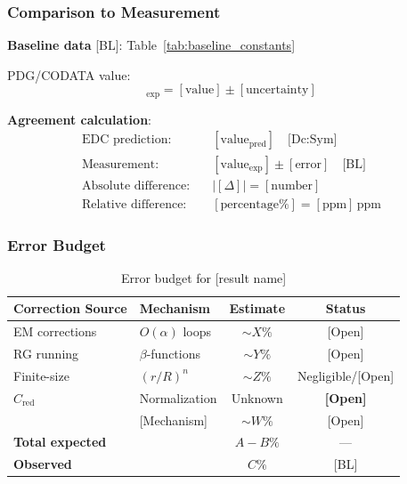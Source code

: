 
\subsubsection{Comparison to Measurement}

\textbf{Baseline data} [BL]: Table~\ref{tab:baseline_constants}

PDG/CODATA value:
\begin{equation}
  [\text{quantity}]_{\text{exp}} = [\text{value}] \pm [\text{uncertainty}]
\end{equation}

\textbf{Agreement calculation}:
\begin{align}
\text{EDC prediction:} \quad &[\text{value}_{\text{pred}}] \quad \text{[Dc:Sym]} \\
\text{Measurement:} \quad &[\text{value}_{\text{exp}}] \pm [\text{error}] \quad \text{[BL]} \\
\text{Absolute difference:} \quad &|[\Delta]| = [\text{number}] \\
\text{Relative difference:} \quad &[\text{percentage}\%] = [\text{ppm}]\,\text{ppm}
\end{align}


\subsubsection{Error Budget}

\begin{table}[h]
\centering
\begin{tabular}{llcc}
\hline
\textbf{Correction Source} & \textbf{Mechanism} & \textbf{Estimate} & \textbf{Status} \\
\hline
EM corrections & $O(\alpha)$ loops & $\sim X\%$ & [Open] \\
RG running & $\beta$-functions & $\sim Y\%$ & [Open] \\
Finite-size & $(r/R)^n$ & $\sim Z\%$ & Negligible/[Open] \\
$C_{\mathrm{red}}$ & Normalization & Unknown & \textbf{[Open]} \\
[Other sources] & [Mechanism] & $\sim W\%$ & [Open] \\
\hline
\textbf{Total expected} & & \textbf{$A{-}B\%$} & --- \\
\textbf{Observed} & & \textbf{$C\%$} & [BL] \\
\hline
\end{tabular}
\caption{Error budget for [result name]}
\label{tab:error_budget_[result]}
\end{table}

